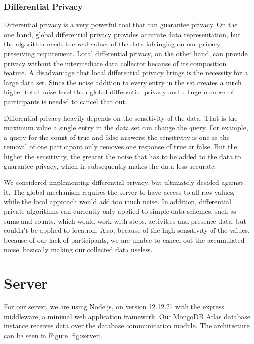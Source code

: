 \subsubsection{Differential Privacy}
Differential privacy is a very powerful tool that can guarantee privacy. On the one hand, global differential privacy provides accurate data representation, but the algorithm needs the real values of the data infringing on our privacy-preserving requirement. Local differential privacy, on the other hand, can provide privacy without the intermediate data collector because of its composition feature. A disadvantage that local differential privacy brings is the necessity for a large data set. Since the noise addition to every entry in the set creates a much higher total noise level than global differential privacy and a huge number of participants is needed to cancel that out. 

Differential privacy heavily depends on the sensitivity of the data. That is the maximum value a single entry in the data set can change the query. For example, a query for the count of true and false answers; the sensitivity is one as the removal of one participant only removes one response of true or false. But the higher the sensitivity, the greater the noise that has to be added to the data to guarantee privacy, which in subsequently makes the data less accurate.

We considered implementing differential privacy, but ultimately decided against it. The global mechanism requires the server to have access to all raw values, while the local approach would add too much noise. In addition, differential private algorithms can currently only applied to simple data schemes, such as sums and counts, which would work with steps, activities and presence data, but couldn't be applied to location. Also, because of the high sensitivity of the values, because of our lack of participants, we are unable to cancel out the accumulated noise, basically making our collected data useless.

\section{Server}
For our server, we are using Node.js,
on version 12.12.21 with the express middleware, a minimal web application framework.
Our MongoDB Atlas database instance
receives data over the database communication module. The architecture can be seen in Figure \ref{fig:server}.


